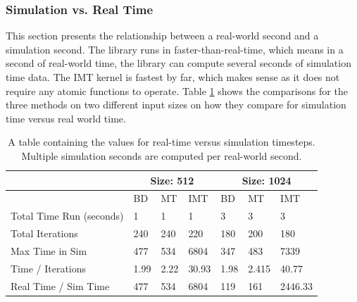 \subsubsection{Simulation vs. Real Time}
This section presents the relationship between a real-world second and a simulation second. The library runs in faster-than-real-time, which means in a second of real-world time, the library can compute several seconds of simulation time data. The IMT kernel is fastest by far, which makes sense as it does not require any atomic functions to operate. Table \ref{table:time_comp} shows the comparisons for the three methods on two different input sizes on how they compare for simulation time versus real world time. 
\begin{table}[H]
\centering
\caption{A table containing the values for real-time versus simulation timesteps. Multiple simulation seconds are computed per real-world second.}
\label{table:time_comp}
\begin{tabular}{l|l|l|l|l|l|l|}
\cline{2-7}
                                                          & \multicolumn{3}{c|}{\cellcolor[HTML]{C0C0C0}\textbf{Size: 512}} & \multicolumn{3}{c|}{\cellcolor[HTML]{C0C0C0}\textbf{Size: 1024}} \\ \hline
\rowcolor[HTML]{EFEFEF} 
\multicolumn{1}{|l|}{\cellcolor[HTML]{EFEFEF}Kernel Used} & BD                  & MT                  & IMT                 & BD                 & MT                  & IMT                   \\ \hline
\multicolumn{1}{|l|}{Total Time Run (seconds)}            & 1                   & 1                   & 1                   & 3                  & 3                   & 3                     \\ \hline
\multicolumn{1}{|l|}{Total Iterations}                    & 240                 & 240                 & 220                 & 180                & 200                 & 180                   \\ \hline
\multicolumn{1}{|l|}{Max Time in Sim}                     & 477                 & 534                 & 6804                & 347                & 483                 & 7339                  \\ \hline
\multicolumn{1}{|l|}{Time / Iterations}                   & 1.99                & 2.22                & 30.93               & 1.98               & 2.415               & 40.77                 \\ \hline
\multicolumn{1}{|l|}{Real Time / Sim Time}                & 477                 & 534                 & 6804                & 119                & 161                 & 2446.33               \\ \hline
\end{tabular}
\end{table}


